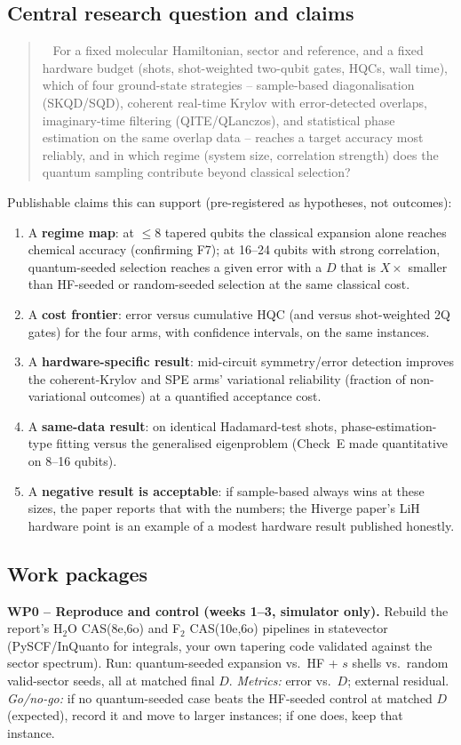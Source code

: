 \documentclass[11pt,a4paper]{article}
\newcommand{\report}{the report}
\newenvironment{idea}[1][Main idea]{\par\smallskip\begin{quotation}\noindent{\bfseries\textcolor{keyblue}{#1.}}\ }{\end{quotation}\smallskip}
\begin{document}
\subsection{Central research question and claims}
\begin{idea}[Research question]
For a fixed molecular Hamiltonian, sector and reference, and a fixed hardware budget (shots, shot-weighted two-qubit gates, HQCs, wall time), which of four ground-state strategies -- sample-based diagonalisation (SKQD/SQD), coherent real-time Krylov with error-detected overlaps, imaginary-time filtering (QITE/QLanczos), and statistical phase estimation on the same overlap data -- reaches a target accuracy most reliably, and in which regime (system size, correlation strength) does the quantum sampling contribute beyond classical selection?
\end{idea}
Publishable claims this can support (pre-registered as hypotheses, not outcomes):
\begin{enumerate}
\item A \textbf{regime map}: at $\le8$ tapered qubits the classical expansion alone reaches chemical accuracy (confirming F7); at 16--24 qubits with strong correlation, quantum-seeded selection reaches a given error with a $D$ that is $X\times$ smaller than HF-seeded or random-seeded selection at the same classical cost.
\item A \textbf{cost frontier}: error versus cumulative HQC (and versus shot-weighted 2Q gates) for the four arms, with confidence intervals, on the same instances.
\item A \textbf{hardware-specific result}: mid-circuit symmetry/error detection improves the coherent-Krylov and SPE arms' variational reliability (fraction of non-variational outcomes) at a quantified acceptance cost.
\item A \textbf{same-data result}: on identical Hadamard-test shots, phase-estimation-type fitting versus the generalised eigenproblem (Check~E made quantitative on 8--16 qubits).
\item A \textbf{negative result is acceptable}: if sample-based always wins at these sizes, the paper reports that with the numbers; the Hiverge paper's LiH hardware point is an example of a modest hardware result published honestly.
\end{enumerate}

\subsection{Work packages}
\textbf{WP0 -- Reproduce and control (weeks 1--3, simulator only).} Rebuild \report's H$_2$O CAS(8e,6o) and F$_2$ CAS(10e,6o) pipelines in statevector (PySCF/InQuanto for integrals, your own tapering code validated against the sector spectrum). Run: quantum-seeded expansion vs.\ HF + $s$ shells vs.\ random valid-sector seeds, all at matched final $D$. \emph{Metrics:} error vs.\ $D$; external residual. \emph{Go/no-go:} if no quantum-seeded case beats the HF-seeded control at matched $D$ (expected), record it and move to larger instances; if one does, keep that instance.
\end{document}
